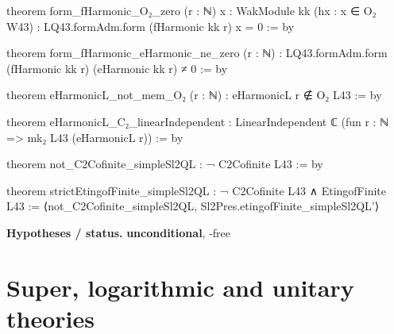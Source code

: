 \documentclass[11pt,openany]{book}
\newcommand{\lean}[1]{\texttt{\detokenize{#1}}}
\theoremstyle{definition}
\theoremstyle{plain}
\begin{document}
\begin{leancode}
theorem form_fHarmonic_O₂_zero (r : ℕ) {x : WakModule kk} (hx : x ∈ O₂ W43) :
    LQ43.formAdm.form (fHarmonic kk r) x = 0 := by

theorem form_fHarmonic_eHarmonic_ne_zero (r : ℕ) :
    LQ43.formAdm.form (fHarmonic kk r) (eHarmonic kk r) ≠ 0 := by

theorem eHarmonicL_not_mem_O₂ (r : ℕ) : eHarmonicL r ∉ O₂ L43 := by

theorem eHarmonicL_C₂_linearIndependent :
    LinearIndependent ℂ (fun r : ℕ => mk₂ L43 (eHarmonicL r)) := by

theorem not_C2Cofinite_simpleSl2QL : ¬ C2Cofinite L43 := by

theorem strictEtingofFinite_simpleSl2QL :
    ¬ C2Cofinite L43 ∧ EtingofFinite L43 :=
  ⟨not_C2Cofinite_simpleSl2QL, Sl2Pres.etingofFinite_simpleSl2QL'⟩
\end{leancode}
\noindent\textbf{Hypotheses / status.} \textbf{unconditional}, \lean{pbw}-free\par
\medskip
\endgroup
\part{Super, logarithmic and unitary theories}
\setcounter{chapter}{16}
\end{document}

